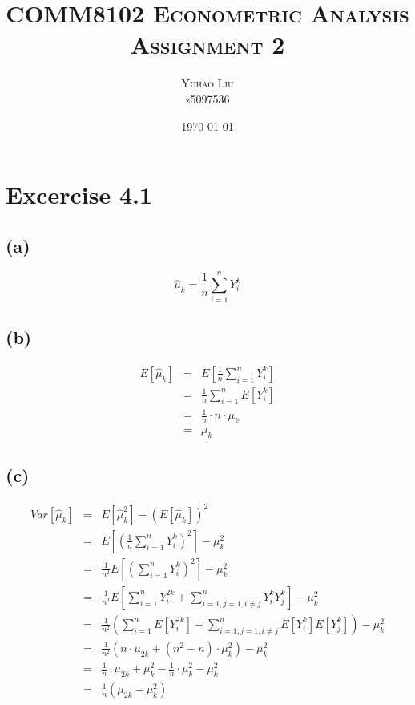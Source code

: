 \documentclass{article}
\begin{document}
\title{ \textsc{COMM8102 Econometric Analysis} \\
\textsc{Assignment 2}}
\author{\textsc{Yuhao Liu} \\
{\small z5097536}}
\date{{\small \today}}
\maketitle

\section*{Excercise 4.1}

\subsection*{(a)}

\begin{equation*}
\hat{\mu}_{k}=\frac{1}{n}\sum_{i=1}^{n}Y_{i}^{k}
\end{equation*}

\subsection*{(b)}

\begin{eqnarray*}
E\left[ \hat{\mu}_{k}\right] &=&E\left[ \frac{1}{n}\sum_{i=1}^{n}Y_{i}^{k}%
\right] \\
&=&\frac{1}{n}\sum_{i=1}^{n}E\left[ Y_{i}^{k}\right] \\
&=&\frac{1}{n}\cdot n\cdot \mu _{k} \\
&=&\mu _{k}
\end{eqnarray*}

\subsection*{(c)}

\begin{eqnarray*}
Var\left[ \hat{\mu}_{k}\right] &=&E\left[ \hat{\mu}_{k}^{2}\right] -\left( E%
\left[ \hat{\mu}_{k}\right] \right) ^{2} \\
&=&E\left[ \left( \frac{1}{n}\sum_{i=1}^{n}Y_{i}^{k}\right) ^{2}\right] -\mu
_{k}^{2} \\
&=&\frac{1}{n^{2}}E\left[ \left( \sum_{i=1}^{n}Y_{i}^{k}\right) ^{2}\right]
-\mu _{k}^{2} \\
&=&\frac{1}{n^{2}}E\left[ \sum_{i=1}^{n}Y_{i}^{2k}+\sum_{i=1,j=1,i\neq
j}^{n}Y_{i}^{k}Y_{j}^{k}\right] -\mu _{k}^{2} \\
&=&\frac{1}{n^{2}}\left( \sum_{i=1}^{n}E\left[ Y_{i}^{2k}\right]
+\sum_{i=1,j=1,i\neq j}^{n}E\left[ Y_{i}^{k}\right] E\left[ Y_{j}^{k}\right]
\right) -\mu _{k}^{2} \\
&=&\frac{1}{n^{2}}\left( n\cdot \mu _{2k}+\left( n^{2}-n\right) \cdot \mu
_{k}^{2}\right) -\mu _{k}^{2} \\
&=&\frac{1}{n}\cdot \mu _{2k}+\mu _{k}^{2}-\frac{1}{n}\cdot \mu _{k}^{2}-\mu
_{k}^{2} \\
&=&\frac{1}{n}\left( \mu _{2k}-\mu _{k}^{2}\right)
\end{eqnarray*}
\end{document}

